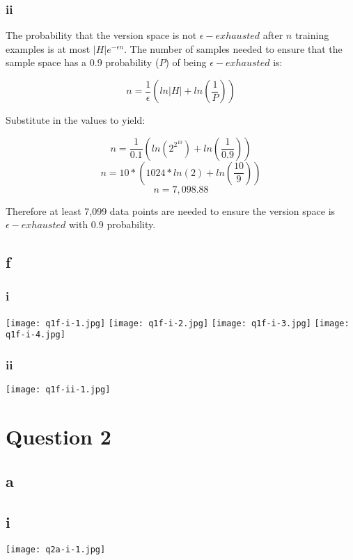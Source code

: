 \documentclass{article}
\begin{document}
\subsubsection*{ii}

The probability that the version space is not \(\epsilon-exhausted\) after \(n\) training examples is at most \(|H|e^{-\epsilon n}\).
The number of samples needed to ensure that the sample space has a 0.9 probability (\(P\)) of being \(\epsilon-exhausted\) is:

\[
    n = \frac{1}{\epsilon}(ln|H| + ln(\frac{1}{P}))
\]

Substitute in the values to yield:

\[
    n = \frac{1}{0.1}(ln(2^{2^{10}}) + ln(\frac{1}{0.9}))
\]
\[
    n = 10*(1024*ln(2) + ln(\frac{10}{9}))
\]
\[
    n = 7,098.88
\]

Therefore at least 7,099 data points are needed to ensure the version space is \(\epsilon-exhausted\) with 0.9 probability.

\subsection*{f}

\subsubsection*{i}
\texttt{[image: q1f-i-1.jpg]}
\newpage
\texttt{[image: q1f-i-2.jpg]}
\newpage
\texttt{[image: q1f-i-3.jpg]}
\newpage
\texttt{[image: q1f-i-4.jpg]}

\subsubsection*{ii}
\texttt{[image: q1f-ii-1.jpg]}

\newpage
\section*{Question 2}

\subsection*{a}
\subsection*{i}
\texttt{[image: q2a-i-1.jpg]}
\end{document}

